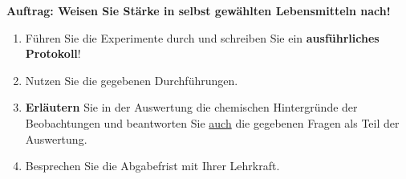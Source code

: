 \documentclass{scrartcl}  %
\begin{document}
\vspace{0.3cm}
			\noindent \textbf{Auftrag: Weisen Sie Stärke in selbst gewählten Lebensmitteln nach!}
			\begin{enumerate}
				\item Führen Sie die Experimente durch und schreiben Sie ein \textbf{ausführliches Protokoll}!
			    \item Nutzen Sie die gegebenen Durchführungen.
			    \item \textbf{Erläutern} Sie in der Auswertung die chemischen Hintergründe der Beobachtungen und beantworten Sie \underline{auch} die gegebenen Fragen als Teil der Auswertung.
			    \item Besprechen Sie die Abgabefrist mit Ihrer Lehrkraft.
			\end{enumerate}	
			
\end{document}
